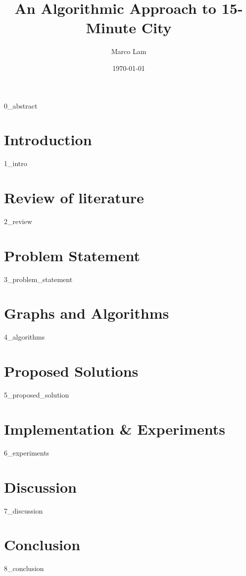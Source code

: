 \documentclass[oneside]{book}
\title{An Algorithmic Approach to 15-Minute City}
\author{Marco Lam}
\date{\today}
\begin{document}
\maketitle

{0_abstract}

\newpage

\tableofcontents
\listoftables
\listofalgorithms
\newpage

\chapter{Introduction}

{1_intro} \label{intro}

\newpage

\chapter{Review of literature} \label{review}

{2_review}

\newpage

\chapter{Problem Statement} \label{problem_statement}

{3_problem_statement}

\newpage

\chapter{Graphs and Algorithms} \label{algorithms}

{4_algorithms}

\newpage

\chapter{Proposed Solutions} \label{proposed_solution}

{5_proposed_solution}

\newpage

\chapter{Implementation \& Experiments} \label{experiments}

{6_experiments}

\newpage

\chapter{Discussion} \label{discussion}

{7_discussion}

\newpage

\chapter{Conclusion} \label{conclusion}

{8_conclusion}

\newpage


\end{document}
